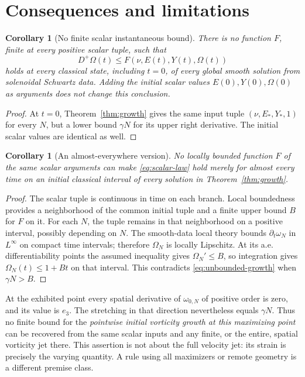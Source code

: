\documentclass[11pt]{article}
\newtheorem{corollary}[theorem]{Corollary}
\theoremstyle{remark}
\begin{document}
\section{Consequences and limitations}\label{sec:consequences}
\begin{corollary}[No finite scalar instantaneous bound]\label{cor:pointwise}
There is no function $F$, finite at every positive scalar tuple, such that
\begin{equation}
 D^+\Omega(t)\le F(\nu,E(t),Y(t),\Omega(t))\label{eq:scalar-law}
\end{equation}
holds at every classical state, including $t=0$, of every global smooth
solution from solenoidal Schwartz data. Adding the initial scalar values
$E(0),Y(0),\Omega(0)$ as arguments does not change this conclusion.
\end{corollary}
\begin{proof}
At $t=0$, Theorem~\ref{thm:growth} gives the same input tuple
$(\nu,E_*,Y_*,1)$ for every $N$, but a lower bound $\gamma N$ for its upper
right derivative. The initial scalar values are identical as well.
\end{proof}

\begin{corollary}[An almost-everywhere version]\label{cor:ae}
No locally bounded function $F$ of the same scalar arguments can make
\eqref{eq:scalar-law} hold merely for almost every time on an initial
classical interval of every solution in Theorem~\ref{thm:growth}.
\end{corollary}
\begin{proof}
The scalar tuple is continuous in time on each branch. Local boundedness
provides a neighborhood of the common initial tuple and a finite upper
bound $B$ for $F$ on it. For each $N$, the tuple remains in that neighborhood
on a positive interval, possibly depending on $N$. The smooth-data local
theory bounds $\partial_t\omega_N$ in $L^\infty$ on compact time intervals;
therefore $\Omega_N$ is locally Lipschitz. At its a.e. differentiability
points the assumed inequality gives $\Omega_N'\le B$, so integration gives
$\Omega_N(t)\le1+Bt$ on that interval. This contradicts
\eqref{eq:unbounded-growth} when $\gamma N>B$.
\end{proof}

At the exhibited point every spatial derivative of $\omega_{0,N}$ of
positive order is zero, and its value is $e_3$. The stretching in that
direction nevertheless equals $\gamma N$. Thus no finite bound for the
\emph{pointwise initial vorticity growth at this maximizing point} can
be recovered from the same scalar inputs and any finite, or the entire,
spatial vorticity jet there. This assertion is not about the full velocity
jet: its strain is precisely the varying quantity. A rule using all
maximizers or remote geometry is a different premise class.
\end{document}
